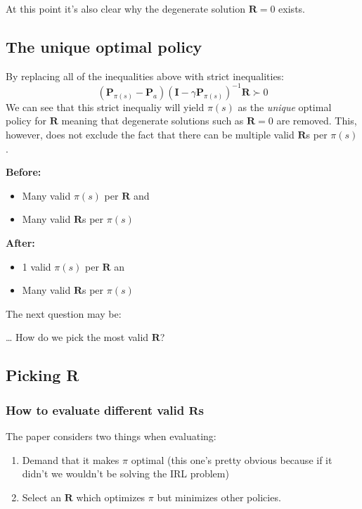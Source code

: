 \documentclass{article}
\begin{document}
    At this point it's also clear why the degenerate solution $\mathbf{R} = 0$ exists.

    \subsection{The unique optimal policy}
    By replacing all of the inequalities above with strict inequalities:
    $$(\mathbf{P}_{\pi(s)} - \mathbf{P}_a)(\mathbf{I} - \gamma \mathbf{P}_{\pi(s)})^{-1} \mathbf{R} \succ 0$$
    We can see that this strict inequaliy will yield $\pi(s)$ as the \emph{unique} optimal policy for $\mathbf{R}$ meaning that degenerate solutions such as $\mathbf{R} = 0$ are removed. This, however, does not exclude the fact that there can be multiple valid $\mathbf{R}$s per $\pi(s)$.

    \textbf{Before:}
    \begin{itemize}
        \item Many valid $\pi(s)$ per $\mathbf{R}$ and
        \item Many valid $\mathbf{R}$s per $\pi(s)$
    \end{itemize}

    \textbf{After:} 
    \begin{itemize}
        \item 1 valid $\pi(s)$ per $\mathbf{R}$ an
        \item Many valid $\mathbf{R}$s per $\pi(s)$
    \end{itemize}

    The next question may be:

    \dots
    How do we pick the most valid $\mathbf{R}$?

    \subsection{Picking R}
   
    \subsubsection{How to evaluate different valid $\mathbf{R}$s}

    The paper considers two things when evaluating:
    \begin{enumerate}
        \item Demand that it makes $\pi$ optimal (this one's pretty obvious because if it didn't we wouldn't be solving the IRL problem)
        \item Select an $\mathbf{R}$ which optimizes $\pi$ but minimizes other policies.
    \end{enumerate}
    
\end{document}
